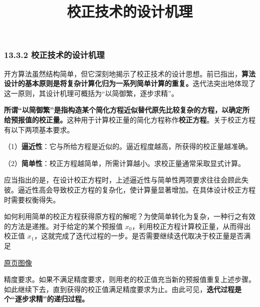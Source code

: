 \documentclass[
  10pt,
  fontset=fandol]{ctexart}
\title{校正技术的设计机理}
\author{}
\date{}
\begin{document}
\maketitle

\subsubsection{13.3.2 校正技术的设计机理}\label{ux6821ux6b63ux6280ux672fux7684ux8bbeux8ba1ux673aux7406}

开方算法虽然结构简单，但它深刻地揭示了校正技术的设计思想。前已指出，\textbf{算法设计的基本原则是将复杂计算化归为一系列简单计算的重复。}迭代法突出地体现了这一原则，其设计机理可概括为``以简御繁，逐步求精''。

\textbf{所谓``以简御繁''是指构造某个简化方程近似替代原先比较复杂的方程，以确定所给预报值的校正量。}这种用于计算校正量的简化方程称作\textbf{校正方程}。关于校正方程有以下两项基本要求。

（1）\textbf{逼近性}：它与所给方程是近似的。逼近程度越高，所获得的校正量越准确。

（2）\textbf{简单性}：校正方程越简单，所需计算越小。求校正量通常采取显式计算。

应当指出的是，在设计校正方程时，上述逼近性与简单性两项要求往往会顾此失彼。逼近性高会导致校正方程的复杂化，使计算量显著增加。在具体设计校正方程时需要权衡得失。

如何利用简单的校正方程获得原方程的解呢？为使简单转化为复杂，一种行之有效的方法是递推。对于给定的某个预报值 \(x_0\)，利用校正方程计算校正量，从而得出校正值 \(x_1\)，这就完成了迭代过程的一步。是否需要继续迭代取决于校正量是否满足

\href{../../source-images/pdf-313.jpeg}{原页图像}

精度要求。如果不满足精度要求，则用老的校正值充当新的预报值重复上述步骤。如此继续下去，直到获得的校正值满足精度要求为止。由此可见，\textbf{迭代过程是个``逐步求精''的递归过程。}
\end{document}
